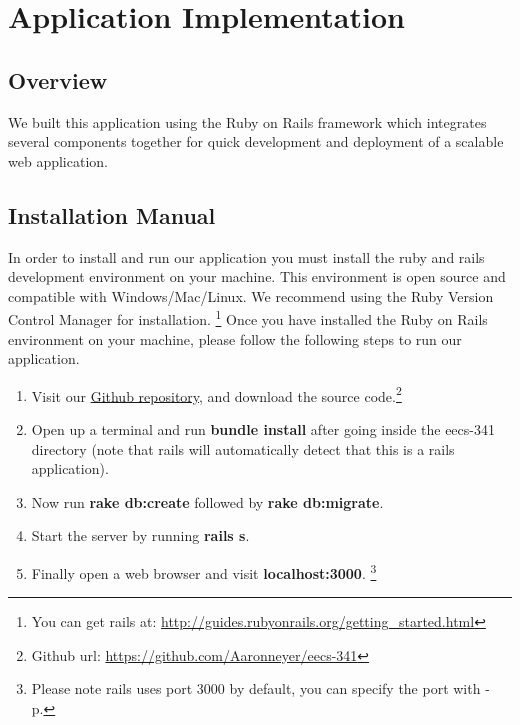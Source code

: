 \documentclass[12pt,letterpaper]{article}
\begin{document}
\clearpage\null

\section{Application Implementation}

\subsection{Overview}
We built this application using the Ruby on Rails framework which integrates several components together for quick development and deployment of a scalable web application.

\subsection{Installation Manual}
In order to install and run our application you must install the ruby and rails development environment on your machine. This environment is open source and compatible with Windows/Mac/Linux. We recommend using the Ruby Version Control Manager for installation. \footnote{You can get rails at: \url{http://guides.rubyonrails.org/getting_started.html}} Once you have installed the Ruby on Rails environment on your machine, please follow the following steps to run our application.

\begin{enumerate}

\item Visit our \href{http://www.github.com/aaronneyer/eecs-341}{Github repository}, and download the source code.\footnote{Github url: \url{https://github.com/Aaronneyer/eecs-341}}

\item Open up a terminal and run {\bf bundle install} after going inside the eecs-341 directory (note that rails will automatically detect that this is a rails application).

\item Now run {\bf rake db:create } followed by {\bf rake db:migrate}.

\item Start the server by running {\bf rails s}.

\item Finally open a web browser and visit {\bf localhost:3000}. \footnote{Please note rails uses port 3000 by default, you can specify the port with -p.}

\end{enumerate}
\end{document}
